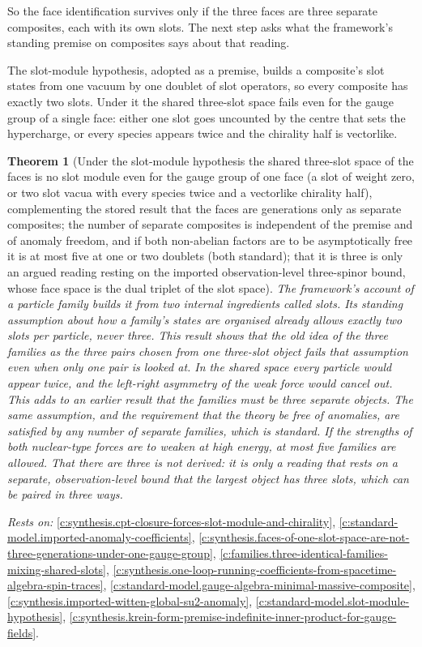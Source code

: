 \documentclass[11pt]{article}
\newtheorem{theorem}{Theorem}[section]
\theoremstyle{definition}
\theoremstyle{plain}
\begin{document}
So the face identification survives only if the three faces are three separate composites, each with its own slots. The next step asks what the framework's standing premise on composites says about that reading.

The slot-module hypothesis, adopted as a premise, builds a composite's slot states from one vacuum by one doublet of slot operators, so every composite has exactly two slots. Under it the shared three-slot space fails even for the gauge group of a single face: either one slot goes uncounted by the centre that sets the hypercharge, or every species appears twice and the chirality half is vectorlike.

\begin{theorem}[Under the slot-module hypothesis the shared three-slot space of the faces is no slot module even for the gauge group of one face (a slot of weight zero, or two slot vacua with every species twice and a vectorlike chirality half), complementing the stored result that the faces are generations only as separate composites; the number of separate composites is independent of the premise and of anomaly freedom, and if both non-abelian factors are to be asymptotically free it is at most five at one or two doublets (both standard); that it is three is only an argued reading resting on the imported observation-level three-spinor bound, whose face space is the dual triplet of the slot space]\label{c:synthesis.slot-module-makes-the-faces-separate-composites-and-leaves-the-generation-number-free}
The framework's account of a particle family builds it from two internal ingredients called slots. Its standing assumption about how a family's states are organised already allows exactly two slots per particle, never three. This result shows that the old idea of the three families as the three pairs chosen from one three-slot object fails that assumption even when only one pair is looked at. In the shared space every particle would appear twice, and the left-right asymmetry of the weak force would cancel out. This adds to an earlier result that the families must be three separate objects. The same assumption, and the requirement that the theory be free of anomalies, are satisfied by any number of separate families, which is standard. If the strengths of both nuclear-type forces are to weaken at high energy, at most five families are allowed. That there are three is not derived: it is only a reading that rests on a separate, observation-level bound that the largest object has three slots, which can be paired in three ways.
\end{theorem}
\noindent\emph{Rests on:} \ref{c:synthesis.cpt-closure-forces-slot-module-and-chirality}, \ref{c:standard-model.imported-anomaly-coefficients}, \ref{c:synthesis.faces-of-one-slot-space-are-not-three-generations-under-one-gauge-group}, \ref{c:families.three-identical-families-mixing-shared-slots}, \ref{c:synthesis.one-loop-running-coefficients-from-spacetime-algebra-spin-traces}, \ref{c:standard-model.gauge-algebra-minimal-massive-composite}, \ref{c:synthesis.imported-witten-global-su2-anomaly}, \ref{c:standard-model.slot-module-hypothesis}, \ref{c:synthesis.krein-form-premise-indefinite-inner-product-for-gauge-fields}.
\end{document}
